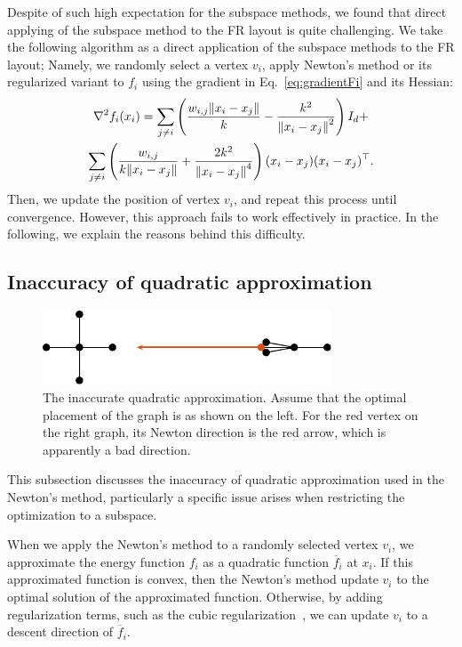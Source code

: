 \documentclass[dvipdfmx,journal]{IEEEtran}
\begin{document}
Despite of such high expectation for the subspace methods, we found that direct applying of the subspace method to the FR layout is quite challenging.
We take the following algorithm as a direct application of the subspace methods to the FR layout; Namely, we randomly select a vertex $v_i$, apply Newton's method or its regularized variant to $f_i$ using the gradient in Eq.~\eqref{eq:gradientFi} and its Hessian:
\begin{gather*}
    \nabla^2 f_i(x_i) = \sum_{j \neq i} \left(\frac{w_{i,j}\norm{x_i - x_j}}{k} - \frac{k^2}{\norm{x_i - x_j}^2}\right) I_d + \\
    \sum_{j \neq i} \left(\frac{w_{i,j}}{k \norm{x_i - x_j}} + \frac{2k^2}{\norm{x_i - x_j}^4}\right) (x_i - x_j)(x_i - x_j)^\top.
\end{gather*}
Then, we update the position of vertex $v_i$, and repeat this process until convergence.
However, this approach fails to work effectively in practice.
In the following, we explain the reasons behind this difficulty.

\subsection{Inaccuracy of quadratic approximation}\label{ssec:inaccuracy}

\begin{figure}[t]
    \centering
    \includegraphics[height=2.2cm]{whyRSNfail/whyRSNfail.pdf}
    \caption{
        The inaccurate quadratic approximation.
        Assume that the optimal placement of the graph is as shown on the left.
        For the red vertex on the right graph, its Newton direction is the red arrow, which is apparently a bad direction.
    }
    \label{fig:whyRSNfail}
\end{figure}

This subsection discusses the inaccuracy of quadratic approximation used in the Newton's method, particularly a specific issue arises when restricting the optimization to a subspace.

When we apply the Newton's method to a randomly selected vertex $v_i$, we approximate the energy function $f_i$ as a quadratic function $\overline{f}_i$ at $x_i$.
If this approximated function is convex, then the Newton's method update $v_i$ to the optimal solution of the approximated function.
Otherwise, by adding regularization terms, such as the cubic regularization~\cite{nesterovCubicRegularizationNewton2006}, we can update $v_i$ to a descent direction of $\overline{f}_i$.
\end{document}
